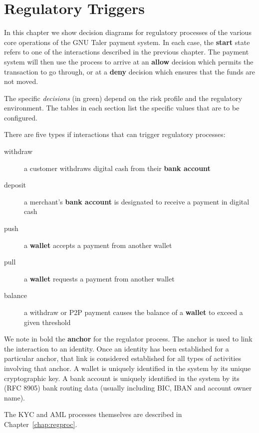 \documentclass[10pt,a4paper,oneside]{book}
\begin{document}
\chapter{Regulatory Triggers} \label{chap:triggers}

In this chapter we show decision diagrams for regulatory processes of the
various core operations of the GNU Taler payment system.  In each case, the
{\bf start} state refers to one of the interactions described in the previous
chapter.  The payment system will then use the process to arrive at an {\bf
  allow} decision which permits the transaction to go through, or at a {\bf
  deny} decision which ensures that the funds are not moved.

The specific {\em decisions} (in green) depend on the risk profile and the
regulatory environment. The tables in each section list the specific values
that are to be configured.

There are five types if interactions that can trigger regulatory processes:

\begin{description}
  \item[withdraw] a customer withdraws digital cash from their {\bf bank account}
  \item[deposit] a merchant's {\bf bank account} is designated to receive a payment in digital cash
  \item[push] a {\bf wallet} accepts a payment from another wallet
  \item[pull] a {\bf wallet} requests a payment from another wallet
  \item[balance] a withdraw or P2P payment causes the balance of a {\bf wallet} to exceed a given threshold
\end{description}

We note in bold the {\bf anchor} for the regulator process. The anchor is used
to link the interaction to an identity.  Once an identity has been established
for a particular anchor, that link is considered established for all types of
activities involving that anchor.  A wallet is uniquely identified in the
system by its unique cryptographic key.  A bank account is uniquely identified
in the system by its (RFC 8905) bank routing data (usually including BIC, IBAN
and account owner name).

The KYC and AML processes themselves are described in
Chapter~\ref{chap:regproc}.






\end{document}

